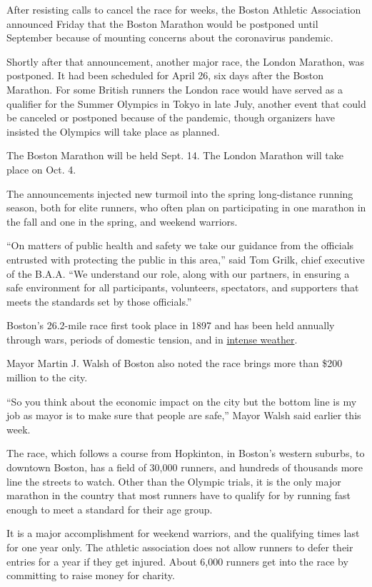 After resisting calls to cancel the race for weeks, the Boston Athletic
Association announced Friday that the Boston Marathon would be postponed
until September because of mounting concerns about the coronavirus
pandemic.

Shortly after that announcement, another major race, the London
Marathon, was postponed. It had been scheduled for April 26, six days
after the Boston Marathon. For some British runners the London race
would have served as a qualifier for the Summer Olympics in Tokyo in
late July, another event that could be canceled or postponed because of
the pandemic, though organizers have insisted the Olympics will take
place as planned.

The Boston Marathon will be held Sept. 14. The London Marathon will take
place on Oct. 4.

The announcements injected new turmoil into the spring long-distance
running season, both for elite runners, who often plan on participating
in one marathon in the fall and one in the spring, and weekend warriors.

``On matters of public health and safety we take our guidance from the
officials entrusted with protecting the public in this area,'' said Tom
Grilk, chief executive of the B.A.A. ``We understand our role, along
with our partners, in ensuring a safe environment for all participants,
volunteers, spectators, and supporters that meets the standards set by
those officials.''

Boston's 26.2-mile race first took place in 1897 and has been held
annually through wars, periods of domestic tension, and in
\href{https://www.nytimes3xbfgragh.onion/2018/04/16/sports/boston-marathon.html}{intense
weather}.

Mayor Martin J. Walsh of Boston also noted the race brings more than
\$200 million to the city.

``So you think about the economic impact on the city but the bottom line
is my job as mayor is to make sure that people are safe,'' Mayor Walsh
said earlier this week.

The race, which follows a course from Hopkinton, in Boston's western
suburbs, to downtown Boston, has a field of 30,000 runners, and hundreds
of thousands more line the streets to watch. Other than the Olympic
trials, it is the only major marathon in the country that most runners
have to qualify for by running fast enough to meet a standard for their
age group.

It is a major accomplishment for weekend warriors, and the qualifying
times last for one year only. The athletic association does not allow
runners to defer their entries for a year if they get injured. About
6,000 runners get into the race by committing to raise money for
charity.

